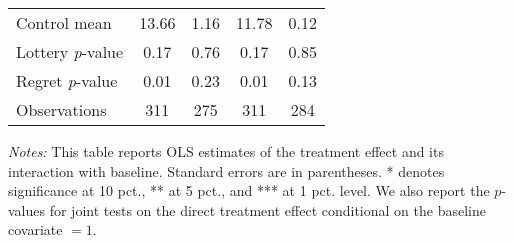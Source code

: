 \begin{table}[htbp]
{\begin{threeparttable}
\begin{tabular}{l*{4}{c}}
Control mean    &    13.66         &     1.16         &    11.78         &     0.12         \\
Lottery \emph{p}-value&     0.17         &     0.76         &     0.17         &     0.85         \\
Regret \emph{p}-value&     0.01         &     0.23         &     0.01         &     0.13         \\
Observations    &      311         &      275         &      311         &      284         \\
\bottomrule \end{tabular} \begin{tablenotes}[flushleft] \footnotesize \item \emph{Notes:} This table reports OLS estimates of the treatment effect and its interaction with baseline. Standard errors are in parentheses. * denotes significance at 10 pct., ** at 5 pct., and *** at 1 pct. level. We also report the \(p\)-values for joint tests on the direct treatment effect conditional on the baseline covariate $= 1$. \end{tablenotes} \end{threeparttable} } \end{table}
